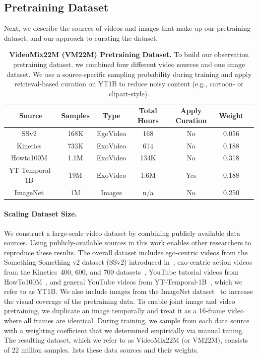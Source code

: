 \documentclass[]{kling/kling}
\begin{document}
\subsection{Pretraining Dataset}
\label{subsec:pretraining_dataset}

Next, we describe the sources of videos and images that make up our pretraining dataset, and our approach to curating the dataset.
\begin{table}[t!]
    \centering
    \small
    \caption{
      \textbf{VideoMix22M (VM22M) Pretraining Dataset.}
      To build our observation pretraining dataset, we combined four different video sources and one image dataset. We use a source-specific sampling probability during training and apply retrieval-based curation on YT1B to reduce noisy content (e.g., cartoon- or clipart-style).}
    \begin{tabular}{ccccccc}
    \toprule
    Source & Samples & Type & Total Hours &  Apply Curation  & Weight\\
    \midrule
    SSv2~\citep{goyal2017something} & 168K & EgoVideo  & 168 & No & 0.056\\
    Kinetics~\citep{carreira2019short} & 733K & ExoVideo  & 614 & No & 0.188\\
    Howto100M~\citep{miech2019howto100m} & 1.1M & ExoVideo  & 134K & No & 0.318\\
    YT-Temporal-1B~\citep{zellers2022merlot} & 19M & ExoVideo  & 1.6M & Yes & 0.188\\
    ImageNet~\citep{deng2009imagenet} & 1M & Images  & n/a & No & 0.250\\
    \end{tabular}
    \label{table:pretraining_dataset}
\end{table}

\paragraph{\bf Scaling Dataset Size.}
We construct a large-scale video dataset by combining publicly available data sources. Using publicly-available sources in this work enables other researchers to reproduce these results. The overall dataset includes ego-centric videos from the Something-Something v2 dataset (SSv2) introduced in~\citet{goyal2017something}, exo-centric action videos from the Kinetics~400, 600, and 700 datasets~\citep{kay2017kinetics, carreira2018short, carreira2019short}, YouTube tutorial videos from HowTo100M~\citep{miech2019howto100m}, and general YouTube videos from YT-Temporal-1B~\citep{zellers2022merlot}, which we refer to as YT1B. We also include images from the ImageNet dataset~\citep{deng2009imagenet} to increase the visual coverage of the pretraining data.
To enable joint image and video pretraining, we duplicate an image temporally and treat it as a 16-frame video where all frames are identical. During training, we sample from each data source with a weighting coefficient that we determined empirically via manual tuning. The resulting dataset, which we refer to as VideoMix22M (or VM22M), consists of 22 million samples.  lists these data sources and their weights.
\end{document}
